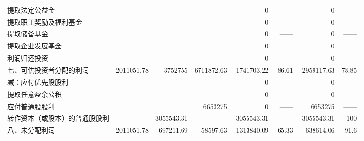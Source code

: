 \begin{longtable}{>{\scriptsize}l>{\scriptsize}r>{\scriptsize}r>{\scriptsize}r>{\scriptsize}r>{\scriptsize}r>{\scriptsize}r>{\scriptsize}r}
\hspace{2ex}	         提取法定公益金	&		&		&		&	0	&	——	&	0	&	——	\\
\hspace{2ex}	         提取职工奖励及福利基金	&		&		&		&	0	&	——	&	0	&	——	\\
\hspace{2ex}	         提取储备基金	&		&		&		&	0	&	——	&	0	&	——	\\
\hspace{2ex}	         提取企业发展基金	&		&		&		&	0	&	——	&	0	&	——	\\
\hspace{2ex}	         利润归还投资	&		&		&		&	0	&	——	&	0	&	——	\\
	七、可供投资者分配的利润	&	2011051.78	&	3752755	&	6711872.63	&	1741703.22	&	86.61	&	2959117.63	&	78.85	\\
\hspace{2ex}	     减：应付优先股股利	&		&		&		&	0	&	——	&	0	&	——	\\
\hspace{2ex}	         提取任意盈余公积	&		&		&		&	0	&	——	&	0	&	——	\\
\hspace{2ex}	         应付普通股股利	&		&		&	6653275	&	0	&	——	&	6653275	&	——	\\
\hspace{2ex}	         转作资本（或股本）的普通股股利	&		&	3055543.31	&		&	3055543.31	&	——	&	-3055543.31	&	-100	\\
	八、未分配利润	&	2011051.78	&	697211.69	&	58597.63	&	-1313840.09	&	-65.33	&	-638614.06	&	-91.6	\\
	\bottomrule
	\end{longtable}\label{lirun}

